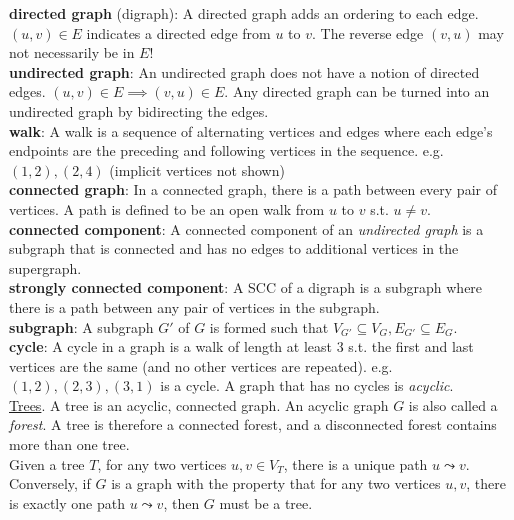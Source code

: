 \documentclass[12pt, fleqn]{general}
\begin{document}
\begin{multicols*}{2}
    \textbf{directed graph} (digraph): A directed graph adds an ordering to each edge. $(u, v) \in E$ indicates a directed edge from $u$ to $v$. The reverse edge $(v, u)$ may not necessarily be in $E$!\\

    \textbf{undirected graph}: An undirected graph does not have a notion of directed edges. $(u, v) \in E \implies (v, u) \in E$. Any directed graph can be turned into an undirected graph by bidirecting the edges.\\

    \textbf{walk}: A walk is a sequence of alternating vertices and edges where each edge's endpoints are the preceding and following vertices in the sequence. e.g. $(1,2), (2,4)$ (implicit vertices not shown)\\

    \textbf{connected graph}: In a connected graph, there is a path between every pair of vertices. A path is defined to be an open walk from $u$ to $v$ s.t. $u \neq v$.\\

    \textbf{connected component}: A connected component of an \emph{undirected graph} is a subgraph that is connected and has no edges to additional vertices in the supergraph.\\

    \textbf{strongly connected component}: A SCC of a digraph is a subgraph where there is a path between any pair of vertices in the subgraph.\\

    \textbf{subgraph}: A subgraph $G'$ of $G$ is formed such that $V_{G'} \subseteq V_G, E_{G'} \subseteq E_G$.\\

    \textbf{cycle}: A cycle in a graph is a walk of length at least $3$ s.t. the first and last vertices are the same (and no other vertices are repeated). e.g. $(1, 2), (2, 3), (3, 1)$ is a cycle. A graph that has no cycles is \emph{acyclic}.\\

    \underline{Trees}. A tree is an acyclic, connected graph. An acyclic graph $G$ is also called a \emph{forest}. A tree is therefore a connected forest, and a disconnected forest contains more than one tree.\\

    Given a tree $T$, for any two vertices $u, v \in V_T$, there is a unique path $u \leadsto v$. Conversely, if $G$ is a graph with the property that for any two vertices $u, v$, there is exactly one path $u \leadsto v$, then $G$ must be a tree.\\


\end{multicols*}
\end{document}
